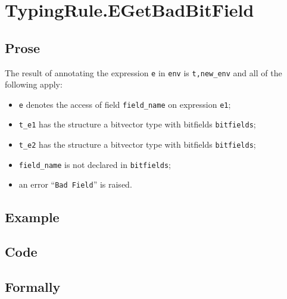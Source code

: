 \documentclass{book}
\begin{document}

\section{TypingRule.EGetBadBitField \label{sec:TypingRule.EGetBadBitField}}

  \subsection{Prose}
  The result of annotating the expression \texttt{e} in \texttt{env} is
\texttt{t,new\_env} and all of the following apply:
  \begin{itemize}
  \item \texttt{e} denotes the access of field \texttt{field\_name} on expression \texttt{e1};
  \item \texttt{t\_e1} has the structure a bitvector type with bitfields \texttt{bitfields};
  \item \texttt{t\_e2} has the structure a bitvector type with bitfields \texttt{bitfields};
  \item \texttt{field\_name} is not declared in \texttt{bitfields};
  \item an error ``\texttt{Bad Field}'' is raised.
  \end{itemize}

  \subsection{Example}

  \subsection{Code}

\begin{emptyformal}
    \subsection{Formally}
\end{emptyformal}

\end{document}
